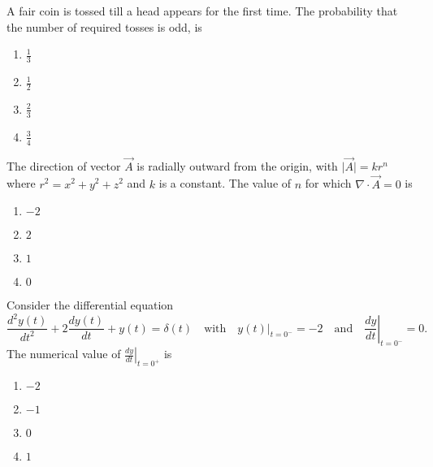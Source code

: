     \item A fair coin is tossed till a head appears for the first time. The probability that the number of required tosses is odd, is

    \begin{multicols}{4}
        \begin{enumerate}
            \item $\frac{1}{3}$
            \item $\frac{1}{2}$
            \item $\frac{2}{3}$
            \item $\frac{3}{4}$
        \end{enumerate}
    \end{multicols}

    \item The direction of vector $\vec{A}$ is radially outward from the origin, with $\lvert \vec{A} \rvert = kr^n$ where $r^2 = x^2 + y^2 + z^2$ and $k$ is a constant. The value of $n$ for which $\nabla \cdot \vec{A} = 0$ is

    \begin{multicols}{4}
        \begin{enumerate}
            \item $-2$
            \item $2$
            \item $1$
            \item $0$
        \end{enumerate}
    \end{multicols}

    \item Consider the differential equation
    $$ \frac{d^2 y(t)}{dt^2} + 2 \frac{dy(t)}{dt} + y(t) = \delta(t) \quad \text{with} \left. \quad y(t) \right|_{t=0^{-}} = -2 \quad \text{and} \quad \left. \frac{dy}{dt} \right|_{t=0^{-}} = 0. $$
    The numerical value of $\left. \frac{dy}{dt} \right|_{t=0^{+}}$ is

    \begin{multicols}{4}
        \begin{enumerate}
            \item $-2$
            \item $-1$
            \item $0$
            \item $1$
        \end{enumerate}
    \end{multicols}
